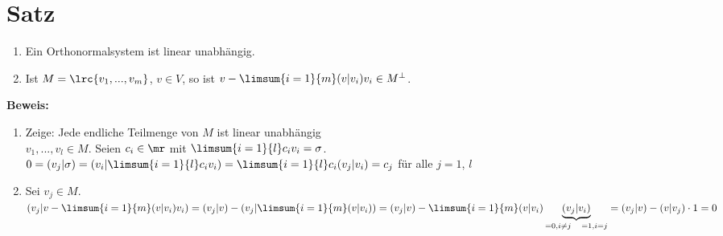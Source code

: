 \section{Satz}
	\begin{enumerate}
		\item Ein Orthonormalsystem ist linear unabhängig.
		\item Ist $ M=\lrc{v_1,...,v_m} $, $ v\in V $, so ist $ v-\limsum{i=1}{m}(v|v_i)v_i\in M^\perp $.
	\end{enumerate}

	\textbf{Beweis:}
	\begin{enumerate}
		\item Zeige: Jede endliche Teilmenge von $ M $ ist linear unabhängig\\
			$ v_1,...,v_l\in M $. Seien $ c_i\in\mr $ mit $ \limsum{i=1}{l}c_iv_i=\sigma $.\\
			$ 0=(v_j|\sigma)=(v_i|\limsum{i=1}{l}c_iv_i)=\limsum{i=1}{l}c_i(v_j|v_i)=c_j $ für alle $ j=1 $, $ l $
		\item Sei $ v_j\in M $. $ (v_j|v-\limsum{i=1}{m}(v|v_i)v_i)=(v_j|v)-(v_j|\limsum{i=1}{m}(v|v_i))=(v_j|v)-\limsum{i=1}{m}(v|v_i)\underbrace{(v_j|v_i)}_{=0, i\neq j \quad =1, i=j}=(v_j|v)-(v|v_j)\cdot 1=0 $
	\end{enumerate}
